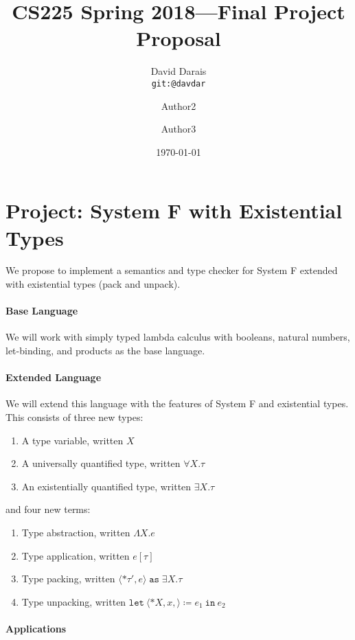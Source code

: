 \documentclass{article}
\title{CS225 Spring 2018---Final Project Proposal}
\author{
  David Darais \\ \small{\texttt{git:@davdar}}
  \and Author2
  \and Author3
}
\date{\today}
\begin{document}
\maketitle

\section*{Project: System F with Existential Types}

We propose to implement a semantics and type checker for System F extended with
existential types (pack and unpack).

\paragraph{Base Language}

We will work with simply typed lambda calculus with booleans, natural numbers,
let-binding, and products as the base language.

\paragraph{Extended Language}

We will extend this language with the features of System F and existential
types. This consists of three new types:
\begin{enumerate}
\item A type variable, written $X$
\item A universally quantified type, written $\forall X.\tau$
\item An existentially quantified type, written $\exists X.\tau$
\end{enumerate}
and four new terms:
\begin{enumerate}
\item Type abstraction, written $\Lambda X.e$
\item Type application, written $e[\tau]$
\item Type packing, written $\langle * \tau' , e \rangle \mathrel{\texttt{as}} \exists X . \tau$
\item Type unpacking, written $\texttt{let}\ \langle * X , x , \rangle
  \coloneqq e_1\ \texttt{in}\ e_2$
\end{enumerate}


\paragraph{Applications}
\end{document}
